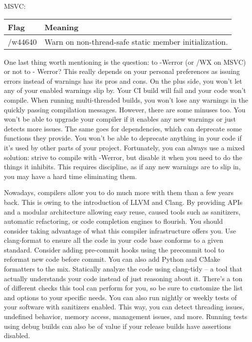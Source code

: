 MSVC:

\begin{table}[H]
	\begin{tabular}{|l|l|}
		\hline
		\textbf{Flag} & \textbf{Meaning}                                      \\ \hline
		/w44640       & Warn on non-thread-safe static member initialization. \\ \hline
	\end{tabular}
\end{table}

One last thing worth mentioning is the question: to -Werror (or /WX on MSVC) or not to - Werror? This really depends on your personal preferences as issuing errors instead of warnings has its pros and cons. On the plus side, you won't let any of your enabled warnings slip by. Your CI build will fail and your code won't compile. When running multi-threaded builds, you won't lose any warnings in the quickly passing compilation messages. However, there are some minuses too. You won't be able to upgrade your compiler if it enables any new warnings or just detects more issues. The same goes for dependencies, which can deprecate some functions they provide. You won't be able to deprecate anything in your code if it's used by other parts of your project. Fortunately, you can always use a mixed solution: strive to compile with -Werror, but disable it when you need to do the things it inhibits. This requires discipline, as if any new warnings are to slip in, you may have a hard time eliminating them.


Nowadays, compilers allow you to do much more with them than a few years back. This is owing to the introduction of LLVM and Clang. By providing APIs and a modular architecture allowing easy reuse, caused tools such as sanitizers, automatic refactoring, or code completion engines to flourish. You should consider taking advantage of what this compiler infrastructure offers you. Use clang-format to ensure all the code in your code base conforms to a given standard. Consider adding pre-commit hooks using the precommit tool to reformat new code before commit. You can also add Python and CMake formatters to the mix. Statically analyze the code using clang-tidy – a tool that actually understands your code instead of just reasoning about it. There's a ton of different checks this tool can perform for you, so be sure to customize the list and options to your specific needs. You can also run nightly or weekly tests of your software with sanitizers enabled. This way, you can detect threading issues, undefined behavior, memory access, management issues, and more. Running tests using debug builds can also be of value if your release builds have assertions disabled.

